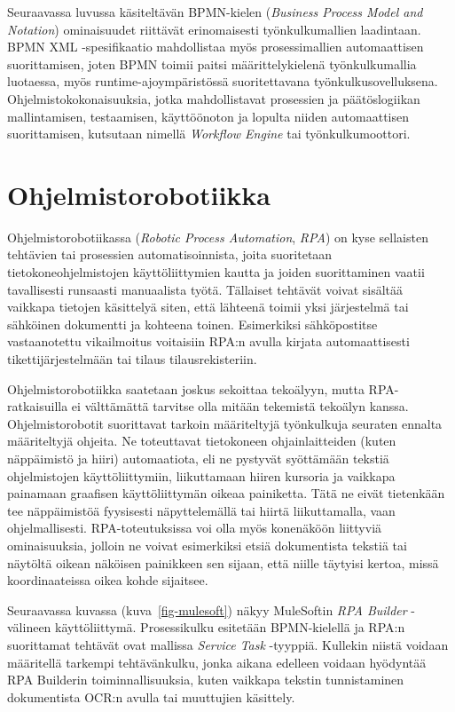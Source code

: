 \documentclass[
  finnish,
  letterpaper,
  DIV=11,
  numbers=noendperiod,
  oneside]{scrreprt}
\begin{document}
Seuraavassa luvussa käsiteltävän BPMN-kielen (\emph{Business Process
Model and Notation}) ominaisuudet riittävät erinomaisesti
työnkulkumallien laadintaan. BPMN XML -spesifikaatio mahdollistaa myös
prosessimallien automaattisen suorittamisen, joten BPMN toimii paitsi
määrittelykielenä työnkulkumallia luotaessa, myös
runtime-ajoympäristössä suoritettavana työnkulkusovelluksena.
Ohjelmistokokonaisuuksia, jotka mahdollistavat prosessien ja
päätöslogiikan mallintamisen, testaamisen, käyttöönoton ja lopulta
niiden automaattisen suorittamisen, kutsutaan nimellä \emph{Workflow
Engine} tai työnkulkumoottori.

\section{Ohjelmistorobotiikka}\label{ohjelmistorobotiikka}

Ohjelmistorobotiikassa (\emph{Robotic Process Automation}, \emph{RPA})
on kyse sellaisten tehtävien tai prosessien automatisoinnista, joita
suoritetaan tietokoneohjelmistojen käyttöliittymien kautta ja joiden
suorittaminen vaatii tavallisesti runsaasti manuaalista työtä. Tällaiset
tehtävät voivat sisältää vaikkapa tietojen käsittelyä siten, että
lähteenä toimii yksi järjestelmä tai sähköinen dokumentti ja kohteena
toinen. Esimerkiksi sähköpostitse vastaanotettu vikailmoitus voitaisiin
RPA:n avulla kirjata automaattisesti tikettijärjestelmään tai tilaus
tilausrekisteriin.

Ohjelmistorobotiikka saatetaan joskus sekoittaa tekoälyyn, mutta
RPA-ratkaisuilla ei välttämättä tarvitse olla mitään tekemistä tekoälyn
kanssa. Ohjelmistorobotit suorittavat tarkoin määriteltyjä työnkulkuja
seuraten ennalta määriteltyjä ohjeita. Ne toteuttavat tietokoneen
ohjainlaitteiden (kuten näppäimistö ja hiiri) automaatiota, eli ne
pystyvät syöttämään tekstiä ohjelmistojen käyttöliittymiin, liikuttamaan
hiiren kursoria ja vaikkapa painamaan graafisen käyttöliittymän oikeaa
painiketta. Tätä ne eivät tietenkään tee näppäimistöä fyysisesti
näpyttelemällä tai hiirtä liikuttamalla, vaan ohjelmallisesti.
RPA-toteutuksissa voi olla myös konenäköön liittyviä ominaisuuksia,
jolloin ne voivat esimerkiksi etsiä dokumentista tekstiä tai näytöltä
oikean näköisen painikkeen sen sijaan, että niille täytyisi kertoa,
missä koordinaateissa oikea kohde sijaitsee.

Seuraavassa kuvassa (kuva~\ref{fig-mulesoft}) näkyy MuleSoftin \emph{RPA
Builder} -välineen
käyttöliittymä. Prosessikulku esitetään BPMN-kielellä ja RPA:n
suorittamat tehtävät ovat mallissa \emph{Service Task} -tyyppiä.
Kullekin niistä voidaan määritellä tarkempi tehtävänkulku, jonka aikana
edelleen voidaan hyödyntää RPA Builderin toiminnallisuuksia, kuten
vaikkapa tekstin tunnistaminen dokumentista OCR:n avulla tai muuttujien
käsittely.
\end{document}
